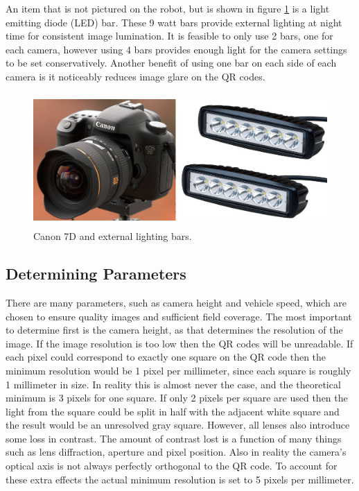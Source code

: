 An item that is not pictured on the robot, but is shown in figure \ref{figure:canon_and_bars} is a light emitting diode (LED) bar.  These 9 watt bars provide external lighting at night time for consistent image lumination.  It is feasible to only use 2 bars, one for each camera, however using 4 bars provides enough light for the camera settings to be set conservatively.  Another benefit of using one bar on each side of each camera is it noticeably reduces image glare on the QR codes.  

\begin{figure}[htb]
	\centering
    \includegraphics[height=2in]{figures/canon7d_and_LEDs.jpg}
    \caption[Canon 7D and LED bars]{Canon 7D and external lighting bars.}
    \label{figure:canon_and_bars}
\end{figure}

\subsection{Determining Parameters}
\label{section:determining_parameters}

There are many parameters, such as camera height and vehicle speed, which are chosen to ensure quality images and sufficient field coverage.  The most important to determine first is the camera height, as that determines the resolution of the image.  If the image resolution is too low then the QR codes will be unreadable.  
If each pixel could correspond to exactly one square on the QR code then the minimum resolution would be 1 pixel per millimeter, since each square is roughly 1 millimeter in size.  In reality this is almost never the case, and the theoretical minimum is 3 pixels for one square.  If only 2 pixels per square are used then the light from the square could be split in half with the adjacent white square and the result would be an unresolved gray square.  However, all lenses also introduce some loss in contrast.  The amount of contrast lost is a function of many things such as lens diffraction, aperture and pixel position.  Also in reality the camera's optical axis is not always perfectly orthogonal to the QR code.  To account for these extra effects the actual minimum resolution is set to 5 pixels per millimeter.  

